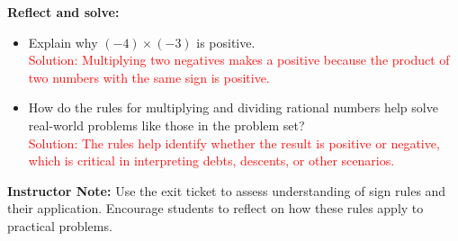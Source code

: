 \documentclass[11pt]{article}
\begin{document}
\begin{tcolorbox}[colframe=black!60, colback=white, 
coltitle=black, colbacktitle=black!15, fonttitle=\bfseries\Large, 
title=Exit Ticket, halign title=center, left=10pt, right=10pt, top=10pt, bottom=15pt]
\textbf{Reflect and solve:}
\begin{itemize}
    \item Explain why \( (-4) \times (-3) \) is positive. \\
    \textcolor{red}{Solution: Multiplying two negatives makes a positive because the product of two numbers with the same sign is positive.}
    \item How do the rules for multiplying and dividing rational numbers help solve real-world problems like those in the problem set? \\
    \textcolor{red}{Solution: The rules help identify whether the result is positive or negative, which is critical in interpreting debts, descents, or other scenarios.}
\end{itemize}

{\color{blue} \textbf{Instructor Note:} Use the exit ticket to assess understanding of sign rules and their application. Encourage students to reflect on how these rules apply to practical problems.}
\end{tcolorbox}
\end{document}
